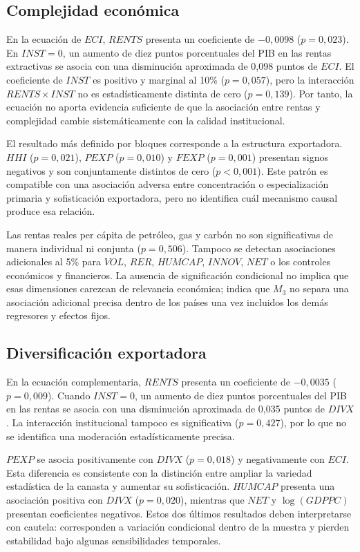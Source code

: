 \documentclass[../../TFM.tex]{subfiles}
\begin{document}
\subsection{Complejidad económica}
\label{subsec:resultados-eci-m3}

En la ecuación de $ECI$, $RENTS$ presenta un coeficiente de $-0,0098$
($p=0,023$). En $INST=0$, un aumento de diez puntos porcentuales del PIB en las
rentas extractivas se asocia con una disminución aproximada de 0,098 puntos de
$ECI$. El coeficiente de $INST$ es positivo y marginal al 10\% ($p=0,057$),
pero la interacción $RENTS\times INST$ no es estadísticamente distinta de cero
($p=0,139$). Por tanto, la ecuación no aporta evidencia suficiente de que la
asociación entre rentas y complejidad cambie sistemáticamente con la calidad
institucional.

El resultado más definido por bloques corresponde a la estructura exportadora.
$HHI$ ($p=0,021$), $PEXP$ ($p=0,010$) y $FEXP$ ($p=0,001$) presentan signos
negativos y son conjuntamente distintos de cero ($p<0,001$). Este patrón es
compatible con una asociación adversa entre concentración o especialización
primaria y sofisticación exportadora, pero no identifica cuál mecanismo causal
produce esa relación.

Las rentas reales per cápita de petróleo, gas y carbón no son significativas de
manera individual ni conjunta ($p=0,506$). Tampoco se detectan asociaciones
adicionales al 5\% para $VOL$, $RER$, $HUMCAP$, $INNOV$, $NET$ o los controles
económicos y financieros. La ausencia de significación condicional no implica
que esas dimensiones carezcan de relevancia económica; indica que $M_3$ no
separa una asociación adicional precisa dentro de los países una vez incluidos
los demás regresores y efectos fijos.

\subsection{Diversificación exportadora}
\label{subsec:resultados-divx-m3}

En la ecuación complementaria, $RENTS$ presenta un coeficiente de $-0,0035$
($p=0,009$). Cuando $INST=0$, un aumento de diez puntos porcentuales del PIB en
las rentas se asocia con una disminución aproximada de 0,035 puntos de $DIVX$.
La interacción institucional tampoco es significativa ($p=0,427$), por lo que
no se identifica una moderación estadísticamente precisa.

$PEXP$ se asocia positivamente con $DIVX$ ($p=0,018$) y negativamente con
$ECI$. Esta diferencia es consistente con la distinción entre ampliar la
variedad estadística de la canasta y aumentar su sofisticación. $HUMCAP$
presenta una asociación positiva con $DIVX$ ($p=0,020$), mientras que $NET$ y
$\log(GDPPC)$ presentan coeficientes negativos. Estos dos últimos resultados
deben interpretarse con cautela: corresponden a variación condicional dentro de
la muestra y pierden estabilidad bajo algunas sensibilidades temporales.
\end{document}
